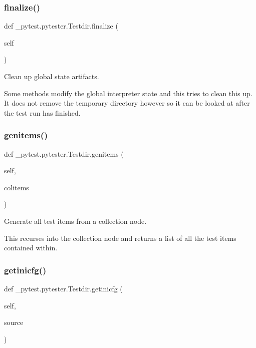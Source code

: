 \subsubsection{\texorpdfstring{finalize()}{finalize()}}
{\footnotesize\ttfamily def \+\_\+pytest.\+pytester.\+Testdir.\+finalize (\begin{DoxyParamCaption}\item[{}]{self }\end{DoxyParamCaption})}

\begin{DoxyVerb}Clean up global state artifacts.

Some methods modify the global interpreter state and this tries to
clean this up.  It does not remove the temporary directory however so
it can be looked at after the test run has finished.\end{DoxyVerb}
 \mbox{\label{class__pytest_1_1pytester_1_1_testdir_af47df60840de34d96ad0b034011a68a8}} 
\subsubsection{\texorpdfstring{genitems()}{genitems()}}
{\footnotesize\ttfamily def \+\_\+pytest.\+pytester.\+Testdir.\+genitems (\begin{DoxyParamCaption}\item[{}]{self,  }\item[{}]{colitems }\end{DoxyParamCaption})}

\begin{DoxyVerb}Generate all test items from a collection node.

This recurses into the collection node and returns a list of all the
test items contained within.\end{DoxyVerb}
 \mbox{\label{class__pytest_1_1pytester_1_1_testdir_a653f63e4b82683b8c4cf119581050d53}} 
\subsubsection{\texorpdfstring{getinicfg()}{getinicfg()}}
{\footnotesize\ttfamily def \+\_\+pytest.\+pytester.\+Testdir.\+getinicfg (\begin{DoxyParamCaption}\item[{}]{self,  }\item[{}]{source }\end{DoxyParamCaption})}

